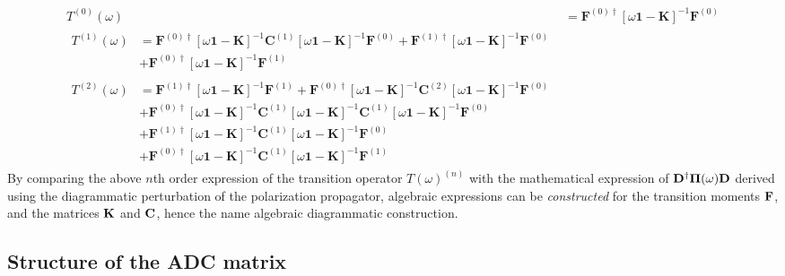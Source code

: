 \begin{align}
T^{(0)}(\omega) &= \mathbf{F}^{(0)\dagger} \left[ \omega \mathbf{1} - \mathbf{K} \right]^{-1} \mathbf{F}^{(0)} \\
\begin{split}
T^{(1)}(\omega) &= \mathbf{F}^{(0)\dagger} \left[ \omega \mathbf{1} - \mathbf{K} \right]^{-1} \mathbf{C}^{(1)} \left[ \omega \mathbf{1} - \mathbf{K} \right]^{-1} \mathbf{F}^{(0)} + \mathbf{F}^{(1)\dagger} \left[ \omega \mathbf{1} - \mathbf{K} \right]^{-1} \mathbf{F}^{(0)} \\
&+ \mathbf{F}^{(0)\dagger} \left[ \omega \mathbf{1} - \mathbf{K} \right]^{-1} \mathbf{F}^{(1)} 
\end{split} 
\\
\begin{split}
T^{(2)}(\omega) &= \mathbf{F}^{(1)\dagger} \left[ \omega \mathbf{1} - \mathbf{K} \right]^{-1} \mathbf{F}^{(1)} + \mathbf{F}^{(0)\dagger} \left[ \omega \mathbf{1} - \mathbf{K} \right]^{-1} \mathbf{C}^{(2)} \left[ \omega \mathbf{1} - \mathbf{K} \right]^{-1} \mathbf{F}^{(0)} \\
&+ \mathbf{F}^{(0)\dagger} \left[ \omega \mathbf{1} - \mathbf{K} \right]^{-1} \mathbf{C}^{(1)} \left[ \omega \mathbf{1} - \mathbf{K} \right]^{-1} \mathbf{C}^{(1)} \left[ \omega \mathbf{1} - \mathbf{K} \right]^{-1} \mathbf{F}^{(0)} \\
&+ \mathbf{F}^{(1)\dagger} \left[ \omega \mathbf{1} - \mathbf{K} \right]^{-1} \mathbf{C}^{(1)} \left[ \omega \mathbf{1} - \mathbf{K} \right]^{-1} \mathbf{F}^{(0)} \\
&+ \mathbf{F}^{(0)\dagger} \left[ \omega \mathbf{1} - \mathbf{K} \right]^{-1} \mathbf{C}^{(1)} \left[ \omega \mathbf{1} - \mathbf{K} \right]^{-1} \mathbf{F}^{(1)}
\end{split}
\end{align}
\noindent By comparing the above $n$th order expression of the transition operator $T(\omega)^{(n)}$ with the mathematical expression of $\mathbf{D}^{\dagger} \mathbf{\Pi}(\omega) \mathbf{D}$ derived using the diagrammatic perturbation of the polarization propagator, algebraic expressions can be \emph{constructed} for the transition moments $\mathbf{F}$, and the matrices $\mathbf{K}$ and $\mathbf{C}$, hence the name algebraic diagrammatic construction.

\subsection{Structure of the ADC matrix}

